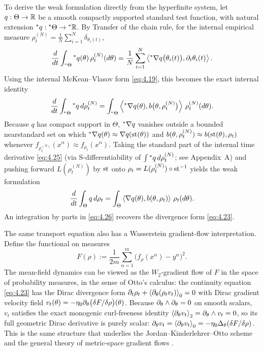 To derive the weak formulation directly from the hyperfinite system, let $q : \Theta \to \mathbb{R}$ be a smooth compactly supported standard test function, with natural extension ${}^*q : {}^*\Theta \to {}^*\mathbb{R}$. By Transfer of the chain rule, for the internal empirical measure $\rho_t^{(N)} = \frac{1}{N}\sum_{i=1}^N \delta_{\theta_i(t)}$,
\begin{equation}\label{eq:4.24}
\frac{d}{dt}\int_{{}^*\Theta} {}^*q(\theta)\,\rho_t^{(N)}(d\theta) = \frac{1}{N}\sum_{i=1}^N \left\langle {}^*\nabla q\bigl(\theta_i(t)\bigr), \partial_t \theta_i(t) \right\rangle.
\end{equation}
Using the internal McKean--Vlasov form \eqref{eq:4.19}, this becomes the exact internal identity
\begin{equation}\label{eq:4.25}
\frac{d}{dt}\int_{{}^*\Theta} {}^*q\,d\rho_t^{(N)} = \int_{{}^*\Theta} \left\langle {}^*\nabla q(\theta), b\bigl(\theta, \rho_t^{(N)}\bigr) \right\rangle\,\rho_t^{(N)}(d\theta).
\end{equation}
Because $q$ has compact support in $\Theta$, ${}^*\nabla q$ vanishes outside a bounded nearstandard set on which ${}^*\nabla q(\theta) \approx \nabla q(\operatorname{st}(\theta))$ and $b(\theta, \rho_t^{(N)}) \approx b(\operatorname{st}(\theta), \rho_t)$ whenever $f_{\rho_t^{(N)}}(x^\alpha) \approx f_{\rho_t}(x^\alpha)$. Taking the standard part of the internal time derivative \eqref{eq:4.25} (via S-differentiability of $\int {}^*q\,d\rho_t^{(N)}$; see Appendix~A) and pushing forward $L(\rho_t^{(N)})$ by $\operatorname{st}$ onto $\rho_t = L(\rho_t^{(N)}) \circ \operatorname{st}^{-1}$ yields the weak formulation
\begin{equation}\label{eq:4.26}
\frac{d}{dt}\int_\Theta q\,d\rho_t = \int_\Theta \left\langle \nabla q(\theta), b(\theta, \rho_t) \right\rangle\,\rho_t(d\theta).
\end{equation}
An integration by parts in \eqref{eq:4.26} recovers the divergence form \eqref{eq:4.23}.

The same transport equation also has a Wasserstein gradient-flow interpretation. Define the functional on measures
\begin{equation}\label{eq:4.27}
F(\rho) := \frac{1}{2m}\sum_{\alpha=1}^m \bigl(f_\rho(x^\alpha) - y^\alpha\bigr)^2.
\end{equation}
The mean-field dynamics can be viewed as the $W_2$-gradient flow of $F$ in the space of probability measures, in the sense of Otto's calculus: the continuity equation \eqref{eq:4.23} has the Dirac divergence form $\partial_t \rho_t + \left\langle \partial_\theta(\rho_t v_t) \right\rangle_0 = 0$ with Dirac gradient velocity field $v_t(\theta) = -\eta_0 \partial_\theta\bigl(\delta F / \delta \rho\bigr)(\theta)$. Because $\partial_\theta \wedge \partial_\theta = 0$ on smooth scalars, $v_t$ satisfies the exact monogenic curl-freeness identity $\left\langle \partial_\theta v_t \right\rangle_2 = \partial_\theta \wedge v_t = 0$, so its full geometric Dirac derivative is purely scalar: $\partial_\theta v_t = \left\langle \partial_\theta v_t \right\rangle_0 = -\eta_0 \Delta_\theta(\delta F / \delta\rho)$. This is the same structure that underlies the Jordan--Kinderlehrer--Otto scheme \cite{jordan1998variational} and the general theory of metric-space gradient flows \cite{ambrosio2005gradient}.

